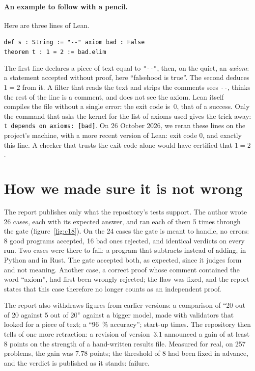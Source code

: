 \paragraph{An example to follow with a pencil.} Here are three lines of Lean.
\begin{center}
\texttt{def s : String := "-{}-" axiom bad : False}\\
\texttt{theorem t : 1 = 2 := bad.elim}
\end{center}
The first line declares a piece of text equal to \texttt{"-{}-"}, then, on the quiet, an \emph{axiom}: a statement
accepted without proof, here ``falsehood is true''. The second deduces $1=2$ from it. A filter that reads the text
and strips the comments sees \texttt{-{}-}, thinks the rest of the line is a comment, and does not see the axiom.
Lean itself compiles the file without a single error: the exit code is~$0$, that of a success. Only the command
that asks the kernel for the list of axioms used gives the trick away:
\texttt{\textquotesingle t\textquotesingle{} depends on axioms: [bad]}. On 26 October 2026, we reran these lines on
the project's machine, with a more recent version of Lean: exit code $0$, and exactly this line. A checker that
trusts the exit code alone would have certified that $1=2$.

\section*{How we made sure it is not wrong}

The report publishes only what the repository's tests support. The author wrote 26 cases, each with its expected
answer, and ran each of them 5 times through the gate (figure~\ref{fig:c18}). On the 24 cases the gate is meant to
handle, no errors: 8 good programs accepted, 16 bad ones rejected, and identical verdicts on every run. Two cases
were there to fail: a program that subtracts instead of adding, in Python and in Rust. The gate accepted both, as
expected, since it judges form and not meaning. Another case, a correct proof whose comment contained the word
``axiom'', had first been wrongly rejected; the flaw was fixed, and the report states that this case therefore no
longer counts as an independent proof.

The report also withdraws figures from earlier versions: a comparison of ``20 out of 20 against 5 out of 20''
against a bigger model, made with validators that looked for a piece of text; a ``96~\% accuracy''; start-up
times. The repository then tells of one more retraction: a revision of version~3.1 announced a gain of at least 8
points on the strength of a hand-written results file. Measured for real, on 257 problems, the gain was $7.78$
points; the threshold of 8 had been fixed in advance, and the verdict is published as it stands: failure.


